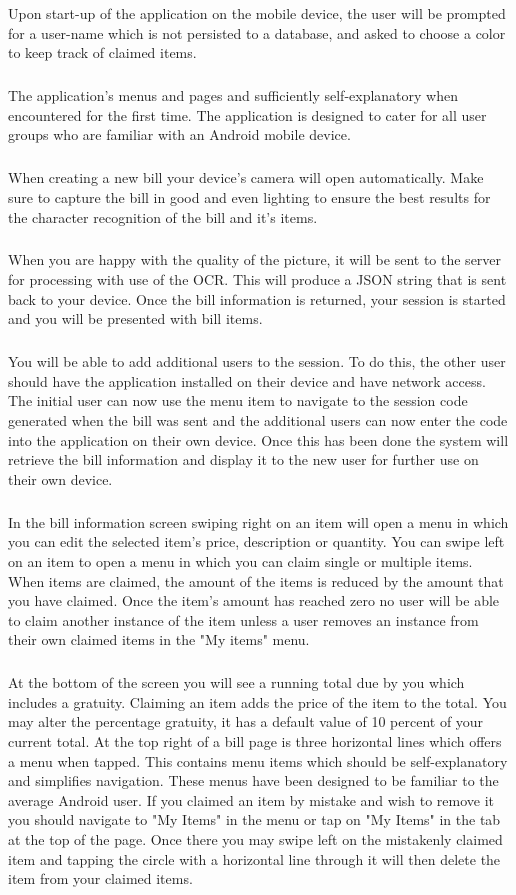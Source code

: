 \documentclass[12pt,a4paper]{article}
\begin{document}
Upon start-up of the application on the mobile device, the user will be prompted for a user-name which is not persisted to a database, and asked to choose a color to keep track of claimed items.
\subparagraph{}
The application's menus and pages and sufficiently self-explanatory when encountered for the first time. The application is designed to cater for all user groups who are familiar with an Android mobile device. 
\subparagraph{}
When creating a new bill your device's camera will open automatically. Make sure to capture the bill in good and even lighting to ensure the best results for the character recognition of the bill and it’s items.
\subparagraph{}
When you are happy with the quality of the picture, it will be sent to the server for processing with use of the OCR. This will produce a JSON string that is sent back to your device. Once the bill information is returned, your session is started and you will be presented with bill items. 
\subparagraph{}
You will be able to add additional users to the session. To do this, the other user should have the application installed on their device and have network access. The initial user can now use the menu item to navigate to the session code generated when the bill was sent and the additional users can now enter the code into the application on their own device. Once this has been done the system will retrieve the bill information and display it to the new user for further use on their own device. 
\subparagraph{}
In the bill information screen swiping right on an item will open a menu in which you can edit the selected item's price, description or quantity. You can swipe left on an item to open a menu in which you can claim single or multiple items. When items are claimed, the amount of the items is reduced by the amount that you have claimed. Once the item’s amount has reached zero no user will be able to claim another instance of the item unless a user removes an instance from their own claimed items in the "My items" menu.  
\subparagraph{}
At the bottom of the screen you will see a running total due by you which includes a gratuity. Claiming an item adds the price of the item to the total. You may alter the percentage gratuity, it has a default value of 10 percent of your current total. 
At the top right of a bill page is three horizontal lines which offers a menu when tapped. This contains menu items which should be self-explanatory and simplifies navigation. These menus have been designed to be familiar to the average Android user. 
If you claimed an item by mistake and wish to remove it you should navigate to "My Items" in the menu or tap on "My Items" in the tab at the top of the page. Once there you may swipe left on the mistakenly claimed item and tapping the circle with a horizontal line through it will then delete the item from your claimed items.
\end{document}
